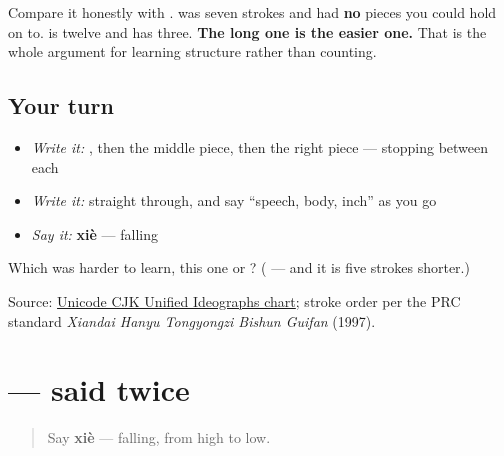 Compare it honestly with .  was seven strokes and had \textbf{no} pieces you could hold on to.  is twelve and has three. \textbf{The long one is the easier one.} That is the whole argument for learning structure rather than counting.

\subsection*{Your turn}
\begin{itemize}
\raggedright
  \item \emph{Write it:} , then the middle piece, then the right piece — stopping between each
  \item \emph{Write it:}  straight through, and say \textquotedblleft{}speech, body, inch\textquotedblright{} as you go
  \item \emph{Say it:} \textbf{xiè} — falling
\end{itemize}

\begin{tcolorbox}[breakable,colback=teal!4,colframe=teal!35!black,title={Before you move on}]
Which was harder to learn, this one or ? (\textbf{} — and it is five strokes shorter.)

Source: \href{https://www.unicode.org/charts/PDF/U4E00.pdf}{Unicode CJK Unified Ideographs chart}; stroke order per the PRC standard \emph{Xiandai Hanyu Tongyongzi Bishun Guifan} (1997).
\end{tcolorbox}
\section[\texorpdfstring{\zh{谢谢} (xièxie)}{谢谢 (xièxie)}]{ — said twice}

\label{lesson:ZH-C10-xiexie}



\begin{quote}
Say \textbf{xiè} — falling, from high to low.
\end{quote}

